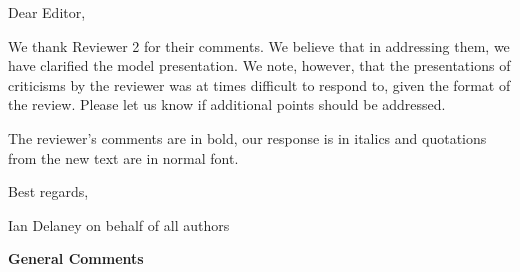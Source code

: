 \documentclass[11pt]{article}
\title{}
\author{}
\begin{document}
Dear Editor,

\vspace{.2cm}

We thank Reviewer 2 for their comments. We believe that in addressing them, we have clarified the model presentation. We note, however, that the presentations of criticisms by the reviewer was at times difficult to respond to, given the format of the review. Please let us know if additional points should be addressed. 

\vspace{.2cm}

The reviewer's comments are in bold, our response is in italics and quotations from the new text are in normal font.

\vspace{.2cm}

Best regards,

\vspace{.75cm}

Ian Delaney on behalf of all authors

\vspace{2cm}

\textbf{General Comments}
\end{document}
